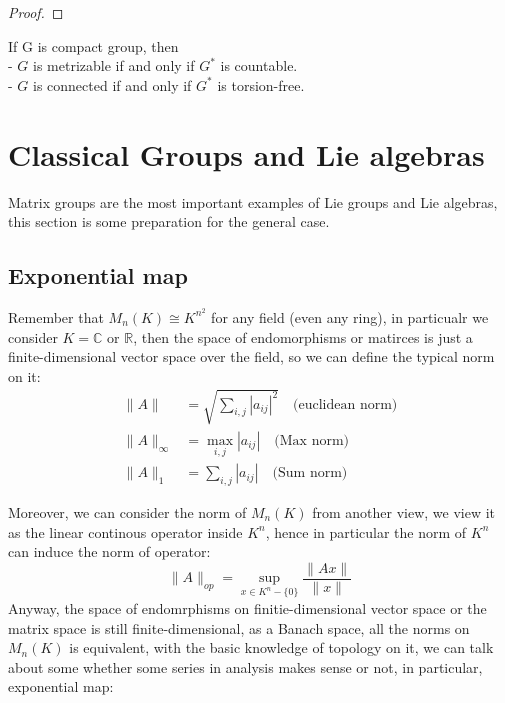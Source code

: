 \begin{proof}
    
\end{proof}

\begin{colorproposition}
    If G is compact group, then\\

    - \(G\) is metrizable if and only if \(G^*\) is countable.\\

    - \(G\) is connected if and only if \(G^*\) is torsion-free.
\end{colorproposition}
    
 \newpage

\section{Classical Groups and Lie algebras}
Matrix groups are the most important examples of Lie groups and Lie algebras, this section is some preparation for the general case.

\subsection{Exponential map}

Remember that \(M_n(K) \cong K^{n^2}\) for any field (even any ring), in particualr we consider \(K = \mathbb{C}\)  or $\mathbb{R}$, then the space of endomorphisms or matirces  is just a finite-dimensional vector space over the field, so we can define the typical norm on it:
\begin{align*}
    \|A\| &= \sqrt{\sum_{i,j} |a_{ij}|^2} \quad \text{(euclidean norm)}\\
    \|A\|_{\infty} &= \max_{i,j} |a_{ij}| \quad \text{(Max norm)}\\
    \|A\|_1 &= \sum_{i,j} |a_{ij}| \quad \text{(Sum norm)}
\end{align*}


Moreover, we can consider the norm of $M_n(K)$ from another view, we view it as the linear continous operator inside $K^n$,  hence in particular the norm of $K^n$ can induce the norm of operator:
\[ \|A\|_{op} = \sup_{x \in K^n - \{0\}} \frac{\|Ax\|}{\|x\|} \]
Anyway, the space of endomrphisms on finitie-dimensional vector space or the matrix space is still finite-dimensional, as a Banach space, all the norms on $M_n(K)$ is equivalent, with the basic knowledge of topology on it, we can talk about some whether some series in analysis makes sense or not, in particular, exponential map:

